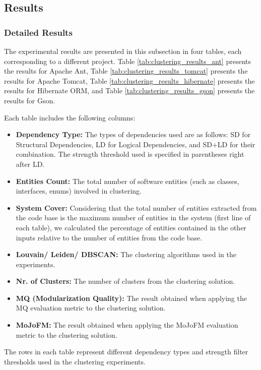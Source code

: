 \documentclass{ieeeaccess}
\begin{document}
\subsection{Results}
\label{subsec:results}

\subsubsection{Detailed Results}

The experimental results are presented in this subsection in four tables, each corresponding to a different project. Table \ref{tab:clustering_results_ant} presents the results for Apache Ant, Table \ref{tab:clustering_results_tomcat} presents the results for Apache Tomcat, Table \ref{tab:clustering_results_hibernate} presents the results for Hibernate ORM, and Table \ref{tab:clustering_results_gson} presents the results for Gson.

Each table includes the following columns:
\begin{itemize}
\item \textbf{Dependency Type:} The types of dependencies used are as follows: SD for Structural Dependencies, LD for Logical Dependencies, and SD+LD for their combination. The strength threshold used is specified in parentheses right after LD.
\item \textbf{Entities Count:} The total number of software entities (such as classes, interfaces, enums) involved in clustering.
\item \textbf{System Cover:} Considering that the total number of entities extracted from the code base is the maximum number of entities in the system (first line of each table), we calculated the percentage of entities contained in the other inputs relative to the number of entities from the code base.
\item \textbf{Louvain/ Leiden/ DBSCAN:} The clustering algorithms used in the experiments.
\item \textbf{Nr. of Clusters:} The number of clusters from the clustering solution.
\item \textbf{MQ (Modularization Quality):} The result obtained when applying the MQ evaluation metric to the clustering solution.
\item \textbf{MoJoFM:} The result obtained when applying the MoJoFM evaluation metric to the clustering solution.
\end{itemize}

The rows in each table represent different dependency types and strength filter thresholds used in the clustering experiments.
\end{document}

